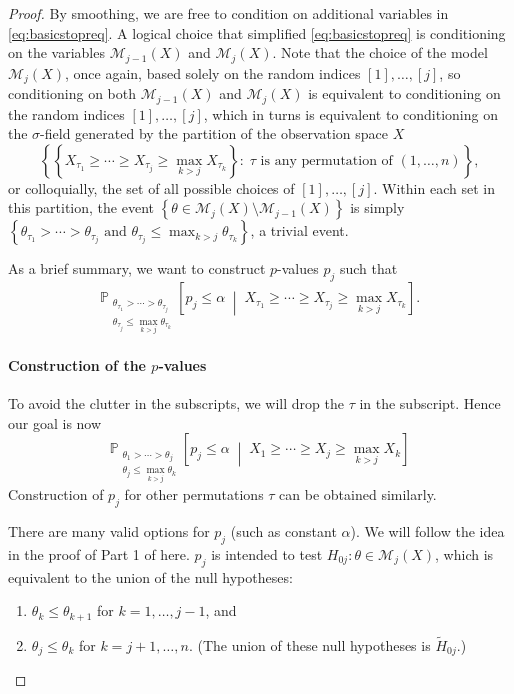\documentclass[aos, authoryear]{imsart}
\theoremstyle{definition}
\theoremstyle{custom}
\newcommand{\PP}{\mathbb{P}}
\begin{document}
\begin{proof}
By smoothing, we are free to condition on additional variables in \eqref{eq:basicstopreq}. A logical choice that simplified \eqref{eq:basicstopreq} is conditioning on the variables $\mathcal{M}_{j-1}\left(X\right)$ and $\mathcal{M}_j\left(X\right)$. Note that the choice of the model $\mathcal{M}_j\left(X\right)$, once again, based solely on the random indices $[1], \ldots, [j]$, so conditioning on both $\mathcal{M}_{j-1}\left(X\right)$ and $\mathcal{M}_j\left(X\right)$ is equivalent to conditioning on the random indices $[1], \ldots, [j]$, which in turns is equivalent to conditioning on the $\sigma$-field generated by the partition of the observation space $X$
\[\left\{\left\{X_{\tau_1} \ge \cdots \ge X_{\tau_j} \ge \max_{k>j} X_{\tau_k}\right\}:\; \tau \text{ is any permutation of } \left(1, \ldots, n\right)\right\},\]
or colloquially, the set of all possible choices of $[1], \ldots, [j]$. Within each set in this partition, the event $\left\{\theta \in \mathcal{M}_j\left(X\right) \setminus \mathcal{M}_{j-1}\left(X\right)\right\}$ is simply $\left\{\theta_{\tau_1} > \cdots > \theta_{\tau_j} \text { and } \theta_{\tau_j} \le \max_{k>j} \theta_{\tau_k}\right\}$, a trivial event.

As a brief summary, we want to construct $p$-values $p_j$ such that
\[\PP_{\substack{\theta_{\tau_1} > \cdots > \theta_{\tau_j} \\ \theta_{\tau_j} \le \max_{k>j} \theta_{\tau_k}}} \left[p_j \le \alpha \;\middle|\; X_{\tau_1} \ge \cdots \ge X_{\tau_j} \ge \max_{k>j} X_{\tau_k}\right].\]

\paragraph{Construction of the $p$-values}

To avoid the clutter in the subscripts, we will drop the $\tau$ in the subscript. Hence our goal is now
\[\PP_{\substack{\theta_1 > \cdots > \theta_j \\ \theta_j \le \max_{k>j} \theta_k}} \left[p_j \le \alpha \;\middle|\; X_1 \ge \cdots \ge X_j \ge \max_{k>j} X_k\right]\]
Construction of $p_j$ for other permutations $\tau$ can be obtained similarly.

There are many valid options for $p_j$ (such as constant $\alpha$). We will follow the idea in the proof of Part 1 of  here. $p_j$ is intended to test $H_{0j}: \theta \in \mathcal{M}_j\left(X\right)$, which is equivalent to the union of the null hypotheses:
\begin{enumerate}
\item $\theta_k \le \theta_{k+1}$ for $k = 1, \ldots, j-1$, and
\item $\theta_j \le \theta_k$ for $k = j+1, \ldots, n$. (The union of these null hypotheses is $\widetilde{H}_{0j}$.)
\end{enumerate}


\end{proof}
\end{document}
